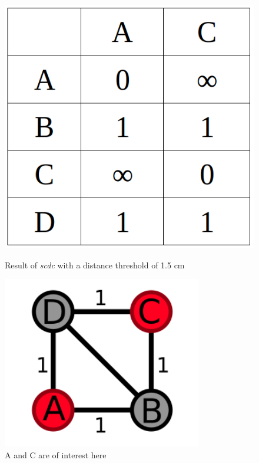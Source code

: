 \begin{figure}[h]
	\centering
	\begin{minipage}[b]{0.29\textwidth}
		\includegraphics[width=\textwidth]{figures/distanceTableWithCanceldist.png}
		\caption{Result of \textit{scdc} with a distance threshold of 1.5 cm}
	\end{minipage}
	\hfill
	\begin{minipage}[b]{0.36\textwidth}
		\includegraphics[width=\textwidth]{figures/meshSCDC.png}
		\caption{A and C are of interest here}
	\end{minipage}
\end{figure}

